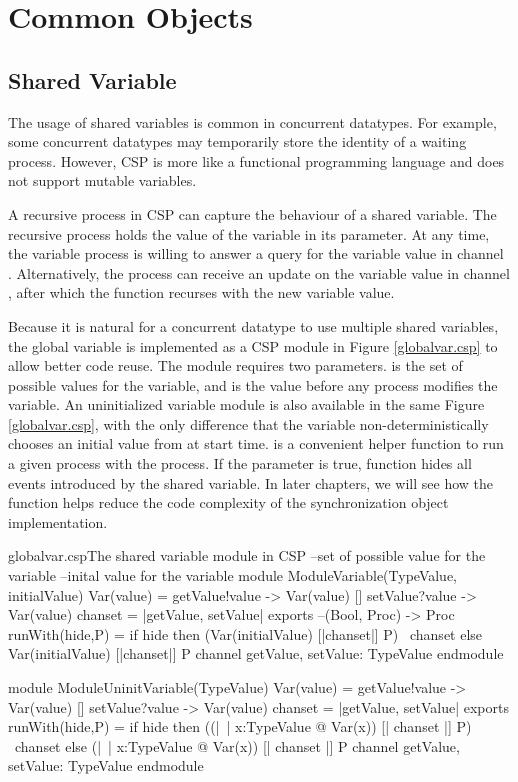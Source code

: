 \documentclass[a4paper, 12pt]{article}
\begin{document}
\section{Common Objects}
\subsection{Shared Variable}
The usage of shared variables is common in concurrent datatypes. For example, some concurrent datatypes may temporarily store the identity of a waiting process. However, CSP is more like a functional programming language and does not support mutable variables. 

A recursive process in CSP can capture the behaviour of a shared variable. The recursive process holds the value of the variable in its parameter. At any time, the variable process is willing to answer a query for the variable value in channel . Alternatively, the process can receive an update on the variable value in channel , after which the function recurses with the new variable value.

Because it is natural for a concurrent datatype to use multiple shared variables, the global variable is implemented as a CSP module in Figure \ref{globalvar.csp} to allow better code reuse. The module requires two parameters.  is the set of possible values for the variable, and  is the value before any process modifies the variable. An uninitialized variable module is also available in the same Figure \ref{globalvar.csp}, with the only difference that the variable non-deterministically chooses an initial value from  at start time.  is a convenient helper function to run a given process  with the  process. If the parameter  is true,  function hides all events introduced by the shared variable. In later chapters, we will see how the  function helps reduce the code complexity of the synchronization object implementation.

\begin{cspfloat}{globalvar.csp}{The shared variable module in CSP}
--set of possible value for the variable
--inital value for the variable
module ModuleVariable(TypeValue, initialValue)
  Var(value) = getValue!value -> Var(value)
             [] setValue?value -> Var(value)
  chanset = {|getValue, setValue|}
exports
  --(Bool, Proc) -> Proc
  runWith(hide,P) = if hide then (Var(initialValue) [|chanset|] P) \ chanset
                            else  Var(initialValue) [|chanset|] P
  channel getValue, setValue: TypeValue
endmodule

module ModuleUninitVariable(TypeValue)
  Var(value) = getValue!value -> Var(value)
            [] setValue?value -> Var(value)
  chanset = {|getValue, setValue|}
exports
  runWith(hide,P) = 
    if hide then ((|~| x:TypeValue @ Var(x)) [| chanset |] P) \ chanset
    else (|~| x:TypeValue @ Var(x)) [| chanset |] P
  channel getValue, setValue: TypeValue
endmodule
\end{cspfloat}
\end{document}
